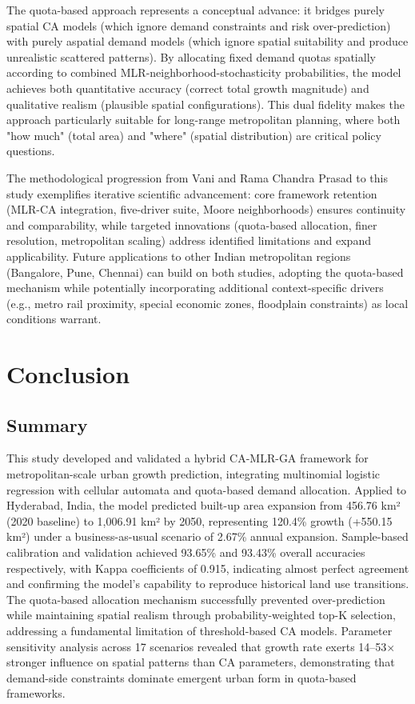 \documentclass[conference]{IEEEtran}
\begin{document}
The quota-based approach represents a conceptual advance: it bridges purely spatial CA models (which ignore demand constraints and risk over-prediction) with purely aspatial demand models (which ignore spatial suitability and produce unrealistic scattered patterns). By allocating fixed demand quotas spatially according to combined MLR-neighborhood-stochasticity probabilities, the model achieves both quantitative accuracy (correct total growth magnitude) and qualitative realism (plausible spatial configurations). This dual fidelity makes the approach particularly suitable for long-range metropolitan planning, where both "how much" (total area) and "where" (spatial distribution) are critical policy questions.

The methodological progression from Vani and Rama Chandra Prasad \cite{vani2022} to this study exemplifies iterative scientific advancement: core framework retention (MLR-CA integration, five-driver suite, Moore neighborhoods) ensures continuity and comparability, while targeted innovations (quota-based allocation, finer resolution, metropolitan scaling) address identified limitations and expand applicability. Future applications to other Indian metropolitan regions (Bangalore, Pune, Chennai) can build on both studies, adopting the quota-based mechanism while potentially incorporating additional context-specific drivers (e.g., metro rail proximity, special economic zones, floodplain constraints) as local conditions warrant.

\section{Conclusion}

\subsection{Summary}

This study developed and validated a hybrid CA-MLR-GA framework for metropolitan-scale urban growth prediction, integrating multinomial logistic regression with cellular automata and quota-based demand allocation. Applied to Hyderabad, India, the model predicted built-up area expansion from 456.76 km² (2020 baseline) to 1,006.91 km² by 2050, representing 120.4\% growth (+550.15 km²) under a business-as-usual scenario of 2.67\% annual expansion. Sample-based calibration and validation achieved 93.65\% and 93.43\% overall accuracies respectively, with Kappa coefficients of 0.915, indicating almost perfect agreement and confirming the model's capability to reproduce historical land use transitions. The quota-based allocation mechanism successfully prevented over-prediction while maintaining spatial realism through probability-weighted top-K selection, addressing a fundamental limitation of threshold-based CA models. Parameter sensitivity analysis across 17 scenarios revealed that growth rate exerts 14--53$\times$ stronger influence on spatial patterns than CA parameters, demonstrating that demand-side constraints dominate emergent urban form in quota-based frameworks.
\end{document}
